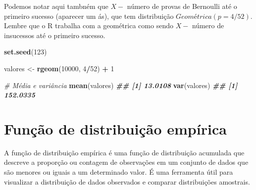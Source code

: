 \documentclass[
]{book}
\newenvironment{Shaded}{\begin{snugshade}}{\end{snugshade}}
\newcommand{\CommentTok}[1]{\textcolor[rgb]{0.56,0.35,0.01}{\textit{#1}}}
\newcommand{\DecValTok}[1]{\textcolor[rgb]{0.00,0.00,0.81}{#1}}
\newcommand{\DocumentationTok}[1]{\textcolor[rgb]{0.56,0.35,0.01}{\textbf{\textit{#1}}}}
\newcommand{\FunctionTok}[1]{\textcolor[rgb]{0.13,0.29,0.53}{\textbf{#1}}}
\newcommand{\NormalTok}[1]{#1}
\newcommand{\OtherTok}[1]{\textcolor[rgb]{0.56,0.35,0.01}{#1}}
\newcommand{\SpecialCharTok}[1]{\textcolor[rgb]{0.81,0.36,0.00}{\textbf{#1}}}
\begin{document}
Podemos notar aqui tambném que \(X-\) número de provas de Bernoulli até o
primeiro sucesso (aparecer um ás), que tem distribuição
\(Geométrica(p=4/52)\). Lembre que o R trabalha com a geométrica como
sendo \(X-\) número de insucessos até o primeiro sucesso.

\begin{Shaded}
\begin{Highlighting}[]
\FunctionTok{set.seed}\NormalTok{(}\DecValTok{123}\NormalTok{)}

\NormalTok{valores }\OtherTok{\textless{}{-}} \FunctionTok{rgeom}\NormalTok{(}\DecValTok{10000}\NormalTok{, }\DecValTok{4}\SpecialCharTok{/}\DecValTok{52}\NormalTok{) }\SpecialCharTok{+} \DecValTok{1}

\CommentTok{\# Média e variância}
\FunctionTok{mean}\NormalTok{(valores)}
\DocumentationTok{\#\# [1] 13.0108}
\FunctionTok{var}\NormalTok{(valores)}
\DocumentationTok{\#\# [1] 152.0335}
\end{Highlighting}
\end{Shaded}

\section{Função de distribuição empírica}\label{funuxe7uxe3o-de-distribuiuxe7uxe3o-empuxedrica}

A função de distribuição empírica é uma função de distribuição acumulada
que descreve a proporção ou contagem de observações em um conjunto de
dados que são menores ou iguais a um determinado valor. É uma ferramenta
útil para visualizar a distribuição de dados observados e comparar
distribuições amostrais.
\end{document}
